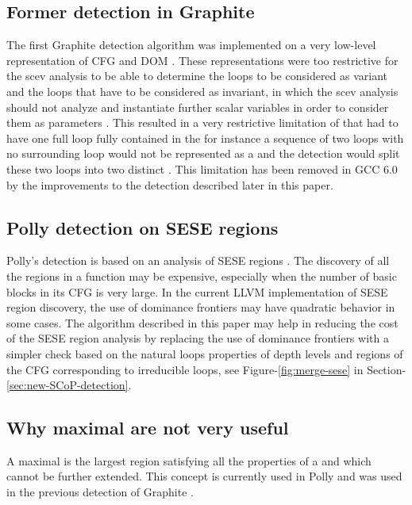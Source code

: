 \documentclass{sig-alternate}
\begin{document}
\subsection{Former \SCoP{} detection in Graphite}
\label{subsec:graphite-SCoP}
The first Graphite \SCoP{} detection algorithm was implemented on a very low-level
representation of CFG and DOM \cite{graphite}.  These representations were too
restrictive for the scev analysis to be able to determine the loops to be
considered as variant and the loops that have to be considered as invariant, in
which the scev analysis should not analyze and instantiate further scalar
variables in order to consider them as parameters \cite{scev}.  This resulted in
a very restrictive limitation of  that had to have one full loop fully
contained in the \SCoP{:} for instance a sequence of two loops with no surrounding
loop would not be represented as a \SCoP{} and the \SCoP{} detection would split these
two loops into two distinct .  This limitation has been removed in GCC 6.0
by the improvements to the \SCoP{} detection described later in this paper.

\subsection{Polly \SCoP{} detection on SESE regions}
\label{subsec:polly-SCoP}
Polly's \SCoP{} detection is based on an analysis of SESE regions \cite{polly}.
The discovery
of all the regions in a function may be expensive, especially when the number of
basic blocks in its CFG is very large.  In the current LLVM implementation of
SESE region discovery, the use of dominance frontiers may have quadratic
behavior in some cases.  The algorithm described in this paper may help in
reducing the cost of the SESE region analysis by replacing the use of dominance
frontiers with a simpler check based on the natural loops properties of depth
levels and regions of the CFG corresponding to irreducible loops, see
Figure-\ref{fig:merge-sese} in Section-\ref{sec:new-SCoP-detection}.

\subsection{Why maximal  are not very useful}
\label{subsec:maximality}
A maximal \SCoP{} is the largest region satisfying all the properties of a \SCoP{} and
which cannot be further extended.  This concept is currently used in Polly
\cite{polly} and was used in the previous \SCoP{} detection of Graphite
\cite{graphite}.
\end{document}
